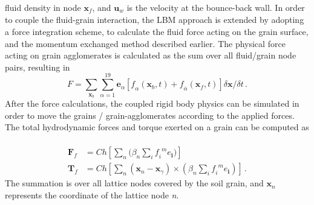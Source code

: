 fluid density in node $\mathbf{x}_{\mathit{f}}$, and $ \mathbf{u}_{\mathit{w}}  
$ is the velocity at the bounce-back wall. In order to couple the 
fluid-grain interaction, the LBM approach is extended by adopting a force 
integration scheme, to calculate the fluid force acting on the grain surface, 
and the momentum exchanged method described earlier. The physical force acting 
on grain agglomerates is calculated as the sum over all fluid/grain node 
pairs, resulting in
%
\begin{equation}
\mathit{F} = 
\sum\limits_{\mathbf{x}_{b}}\sum\limits_{\alpha=1}^{19}{\mathbf{e}_{\alpha}
	[\mathit{f}_{\alpha}(\mathbf{x}_{b},t)
		+\mathit{f}_{\overline{\alpha}}(\mathbf{x}_{f},t)]
 				\delta \mathbf{x} / \delta t}\,.
\end{equation}
%
After the force calculations, the coupled rigid body physics can be simulated 
in order to move the grains / grain-agglomerates according to the applied 
forces. The total hydrodynamic forces and torque exerted on a grain can be 
computed as ~\citep{Cook2004, Noble1998}
%
\begin{align}
\mathbf{F}_{f} & = \mathit{Ch}[\sum\limits_{\mathit{n}}{(\beta_{\mathit{n}} 
\sum\limits_{\mathit{i}}{\mathit{f_i}^{\mathit{ m}}\mathbf{\mathit{e}_i}}})] \\ 
\mathbf{T}_{f} & = 
\mathit{Ch}[\sum\limits_{\mathit{n}}{(\mathbf{x}_{\mathit{n}}-\mathbf{x}_{\gamma})
 \times (\beta_{\mathit{n}} \sum\limits_{\mathit{i}}{\mathit{f_i}^{\mathit{ 
m}}\mathbf{\mathit{e}_i}})}]\,.
\end{align}
%
The summation is over all lattice nodes covered by the soil grain, and 
$\mathbf{x}_{\mathit{n}}$ represents the coordinate of the lattice node 
\textit{n}.
%
